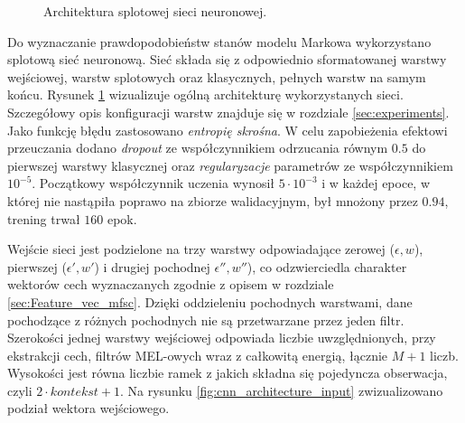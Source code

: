 \documentclass[shortabstract, mgr]{iithesis}
\begin{document}
\begin{figure}[H]
		\label{fig:cnn_architecture_1}
		\caption{Architektura splotowej sieci neuronowej.}
	\end{figure}

	Do wyznaczanie prawdopodobieństw stanów modelu Markowa wykorzystano splotową sieć neuronową. Sieć składa się z odpowiednio sformatowanej warstwy wejściowej, warstw splotowych oraz klasycznych, pełnych warstw na samym końcu. Rysunek \ref{fig:cnn_architecture_1} wizualizuje ogólną architekturę wykorzystanych sieci. Szczegółowy opis konfiguracji warstw znajduje się w rozdziale \ref{sec:experiments}. Jako funkcję błędu zastosowano \textit{entropię skrośna}. W celu zapobieżenia efektowi przeuczania dodano \textit{dropout} ze współczynnikiem odrzucania równym $0.5$ do pierwszej warstwy klasycznej oraz \textit{regularyzacje} parametrów ze współczynnikiem $10^{-5}$. Początkowy współczynnik uczenia wynosił $5 \cdot 10^{-3}$ i w każdej epoce, w której nie nastąpiła poprawo na zbiorze walidacyjnym, był mnożony przez $0.94$, trening trwał $160$ epok.
	
	Wejście sieci jest podzielone na trzy warstwy odpowiadające zerowej ($\epsilon, w$), pierwszej ($\epsilon', w'$) i drugiej pochodnej $\epsilon'', w''$), co odzwierciedla charakter wektorów cech wyznaczanych zgodnie z opisem w rozdziale \ref{sec:Feature_vec_mfsc}. Dzięki oddzieleniu pochodnych warstwami, dane pochodzące z różnych pochodnych nie są przetwarzane przez jeden filtr. Szerokości jednej warstwy wejściowej odpowiada liczbie uwzględnionych, przy ekstrakcji cech, filtrów MEL-owych wraz z całkowitą energią, łącznie $M+1$ liczb. Wysokości jest równa liczbie ramek z jakich składna się pojedyncza obserwacja, czyli $2\cdot kontekst + 1$. Na rysunku \ref{fig:cnn_architecture_input} zwizualizowano podział wektora wejściowego. 
	
\end{document}
